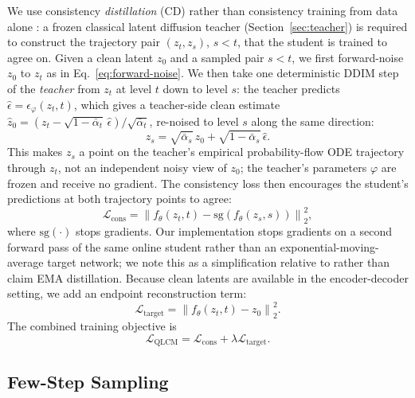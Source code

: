 \documentclass[11pt]{article}
\begin{document}
We use consistency \emph{distillation} (CD) rather than consistency training
from data alone \citep{song2023consistency}: a frozen classical latent
diffusion teacher (Section~\ref{sec:teacher}) is required to construct the
trajectory pair $(z_t, z_s)$, $s<t$, that the student is trained to agree on.
Given a clean latent $z_0$ and a sampled pair $s<t$, we first forward-noise
$z_0$ to $z_t$ as in Eq.~\eqref{eq:forward-noise}. We then take one deterministic DDIM step of the
\emph{teacher} from $z_t$ at level $t$ down to level $s$: the teacher predicts
$\hat\epsilon = \epsilon_\varphi(z_t,t)$, which gives a teacher-side clean
estimate $\hat{z}_0 = (z_t - \sqrt{1-\bar\alpha_t}\,\hat\epsilon)/\sqrt{\bar\alpha_t}$,
re-noised to level $s$ along the same direction:
\begin{equation}
    z_s = \sqrt{\bar\alpha_s}\,\hat{z}_0 + \sqrt{1-\bar\alpha_s}\,\hat\epsilon.
\end{equation}
This makes $z_s$ a point on the teacher's empirical probability-flow ODE
trajectory through $z_t$, not an independent noisy view of $z_0$; the
teacher's parameters $\varphi$ are frozen and receive no gradient. The
consistency loss then encourages the student's predictions at both trajectory
points to agree:
\begin{equation}
    \mathcal{L}_{\mathrm{cons}} =
    \left\|
    f_\theta(z_t,t) -
    \mathrm{sg}\left(f_\theta(z_s,s)\right)
    \right\|_2^2,
\end{equation}
where $\mathrm{sg}(\cdot)$ stops gradients. Our implementation stops gradients
on a second forward pass of the same online student rather than an
exponential-moving-average target network; we note this as a simplification
relative to \citet{song2023consistency} rather than claim EMA distillation.
Because clean latents are available in the encoder-decoder setting, we add an
endpoint reconstruction term:
\begin{equation}
    \mathcal{L}_{\mathrm{target}} =
    \left\|
    f_\theta(z_t,t) - z_0
    \right\|_2^2.
\end{equation}
The combined training objective is
\begin{equation}
    \mathcal{L}_{\mathrm{QLCM}} =
    \mathcal{L}_{\mathrm{cons}} +
    \lambda \mathcal{L}_{\mathrm{target}}.
\end{equation}

\subsection{Few-Step Sampling}
\label{sec:few-step-sampling}
\end{document}
